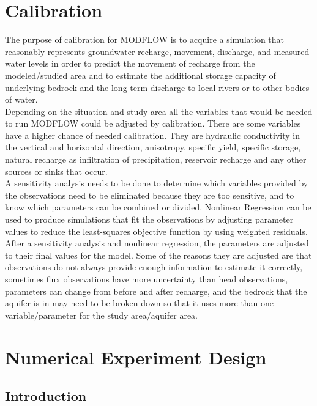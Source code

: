 \documentclass[]{report}
\begin{document}
\chapter{Calibration}
The purpose of calibration for MODFLOW is to acquire a simulation that reasonably represents groundwater recharge, movement, discharge, and measured water levels in order to predict the movement of recharge from the modeled/studied area and to estimate the additional storage capacity of underlying bedrock and the long-term discharge to local rivers or to other bodies of water. \\
Depending on the situation and study area all the variables that would be needed to run MODFLOW could be adjusted by calibration. There are some variables have a higher chance of needed calibration. They are hydraulic conductivity in the vertical and horizontal direction, anisotropy, specific yield, specific storage, natural recharge as infiltration of precipitation, reservoir recharge and any other sources or sinks that occur.  \\
A sensitivity analysis needs to be done to determine which variables provided by the observations need to be eliminated because they are too sensitive, and to know which parameters can be combined or divided. 
Nonlinear Regression can be used to produce simulations that fit the observations by adjusting parameter values to reduce the least-squares objective function by using weighted residuals. \\
After a sensitivity analysis and nonlinear regression, the parameters are adjusted to their final values for the model. Some of the reasons they are adjusted are that observations do not always provide enough information to estimate it correctly, sometimes flux observations have more uncertainty than head observations, parameters can change from before and after recharge, and the bedrock that the aquifer is in may need to be broken down so that it uses more than one variable/parameter for the study area/aquifer area. 

\chapter{Numerical Experiment Design}
\section{Introduction}
\end{document}
